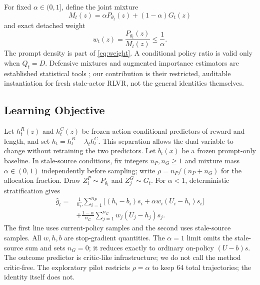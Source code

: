 \documentclass{article}
\begin{document}
For fixed $\alpha\in(0,1]$, define the joint mixture
\begin{equation}
M_t(z)=\alpha P_{\theta_t}(z)+(1-\alpha)G_t(z)
\end{equation}
and exact detached weight
\begin{equation}
w_t(z)=\frac{P_{\theta_t}(z)}{M_t(z)}
\le \frac{1}{\alpha}.
\label{eq:weight}
\end{equation}
The prompt density is part of \cref{eq:weight}. A conditional policy ratio is
valid only when $Q_t=D$.
Defensive mixtures and augmented importance estimators are established
statistical tools \cite{owen2000safe,dudik2011doubly}; our contribution is
their restricted, auditable instantiation for fresh stale-actor RLVR, not the
general identities themselves.

\subsection{Learning Objective}

Let $h_t^R(z)$ and $h_t^C(z)$ be frozen action-conditional predictors of reward
and length, and set $h_t=h_t^R-\lambda_th_t^C$. This separation allows the
dual variable to change without retraining the two predictors. Let $b_t(x)$ be
a frozen prompt-only baseline. In stale-source conditions, fix integers
$n_P,n_G\ge1$ and mixture mass $\alpha\in(0,1)$ independently before sampling;
write $\rho=n_P/(n_P+n_G)$ for the allocation fraction. Draw
$Z_i^P\sim P_{\theta_t}$ and $Z_j^G\sim G_t$. For $\alpha<1$, deterministic
stratification gives
\begin{align}
\widehat g_t={}&
\frac1{n_P}\sum_{i=1}^{n_P}
\Big[(h_i-b_i)s_i+
\alpha w_i(U_i-h_i)s_i\Big]\nonumber\\
&+\frac{1-\alpha}{n_G}\sum_{j=1}^{n_G}
w_j(U_j-h_j)s_j.
\label{eq:estimator}
\end{align}
The first line uses current-policy samples and the second uses stale-source
samples. All $w,h,b$ are stop-gradient quantities. The $\alpha=1$ limit omits
the stale-source sum and sets $n_G=0$; it reduces exactly to ordinary on-policy
$(U-b)s$. The outcome predictor is critic-like infrastructure; we do not call
the method critic-free. The exploratory pilot restricts $\rho=\alpha$ to keep
64 total trajectories; the identity itself does not.
\end{document}
